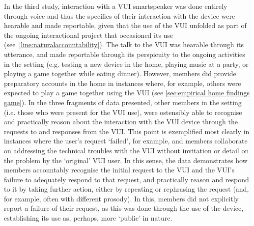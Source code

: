 \begin{revisedsubmission}
In the third study, interaction with a \ac{VUI} smartspeaker was done entirely through voice and thus the specifics of their interaction with the device were hearable and made reportable, given that the use of the \ac{VUI} unfolded as part of the ongoing interactional project that occasioned its use (see~\ref{line:naturalaccountability}).
The talk to the \ac{VUI} was hearable through its utterance, and made reportable through its perspicuity to the ongoing activities in the setting (e.g. testing a new device in the home, playing music at a party, or playing a game together while eating dinner).
However, members did provide preparatory accounts in the home in instances where, for example, others were expected to play a game together using the \ac{VUI} (see \ref{sec:empirical home findings game}).
In the three fragments of data presented, other members in the setting (i.e. those who were present for the \ac{VUI} use), were ostensibly able to recognise and practically reason about the interaction with the \ac{VUI} device through the requests to and responses from the \ac{VUI}.
This point is exemplified most clearly in instances where the user's request `failed', for example, and members collaborate on addressing the technical troubles with the \ac{VUI} without invitation or detail on the problem by the `original' \ac{VUI} user.
In this sense, the data demonstrates how members accountably recognise the initial request to the \ac{VUI} and the \ac{VUI}'s failure to adequately respond to that request, and practically reason and respond to it by taking further action, either by repeating or rephrasing the request (and, for example, often with different prosody).
In this, members did not explicitly report a failure of their request, as this was done through the use of the device, establishing its use as, perhaps, more `public' in nature.
\end{revisedsubmission}

